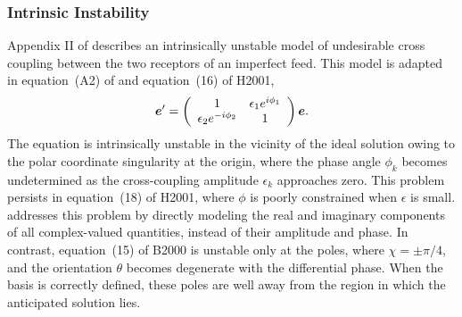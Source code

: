 \subsubsection{Intrinsic Instability}

Appendix II of \cite{ck69} describes an intrinsically unstable model of undesirable cross coupling between the two receptors of an imperfect feed.
%
This model is adapted in equation~(A2) of \cite{scr+84} 
and equation~(16) of H2001,
%
\begin{equation}
\mbox{\boldmath $e$}'=\left(
 \begin{array}{cc}
1 & \epsilon_1 e^{i\phi_1} \\
\epsilon_2 e^{-i\phi_2} & 1
\end{array}
 \right) \mbox{\boldmath $e$}.\label{eqn:hpn+01_eqn16}
\end{equation}
%
The equation is intrinsically unstable in the vicinity of the 
ideal solution owing to the polar coordinate singularity at the origin,
where the phase angle $\phi_k$ becomes 
undetermined as the cross-coupling amplitude $\epsilon_k$ 
approaches zero.  
%
This problem persists in equation~(18) of H2001, where
$\phi$ is poorly constrained when $\epsilon$ is small. 
%
\cite{joh02} addresses this problem by directly modeling the real 
and imaginary components of all complex-valued quantities,
instead of their amplitude and phase.
%
%
In contrast, equation~(15) of B2000 is
unstable only at the poles, where $\chi = \pm\pi/4$, 
and the orientation $\theta$ becomes degenerate
with the differential phase.  When the basis is correctly defined, these poles are well away from the region 
in which the anticipated solution lies.

